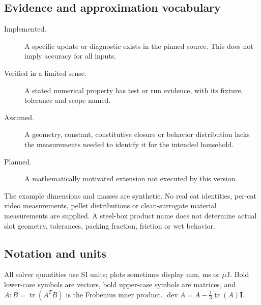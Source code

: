 \documentclass[11pt,a4paper]{article}
\numberwithin{equation}{section}
\begin{document}
\subsection{Evidence and approximation vocabulary}
\begin{description}
 \item[Implemented.] A specific update or diagnostic exists in the pinned source.
 This does not imply accuracy for all inputs.
 \item[Verified in a limited sense.] A stated numerical property has test or run
 evidence, with its fixture, tolerance and scope named.
 \item[Assumed.] A geometry, constant, constitutive closure or behavior distribution
 lacks the measurements needed to identify it for the intended household.
 \item[Planned.] A mathematically motivated extension not executed by this version.
\end{description}
The example dimensions and masses are synthetic. No real cat identities,
per-cat video measurements, pellet distributions or clean-surrogate material
measurements are supplied. A steel-box product name does not determine actual
slot geometry, tolerances, packing fraction, friction or wet behavior.

\subsection{Notation and units}
All solver quantities use SI units; plots sometimes display mm, ms or $\mu$J.
Bold lower-case symbols are vectors, bold upper-case symbols are matrices, and
$A:B=\operatorname{tr}(A^TB)$ is the Frobenius inner product.
$\operatorname{dev}A=A-\tfrac13\operatorname{tr}(A)\mathbf I$.
\end{document}
